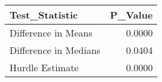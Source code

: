 \begin{table}
\centering\begingroup\fontsize{6}{8}\selectfont

\begin{tabular}{lr}
\toprule
Test\_Statistic & P\_Value\\
\midrule
Difference in Means & 0.0000\\
Difference in Medians & 0.0404\\
Hurdle Estimate & 0.0000\\
\bottomrule
\end{tabular}
\endgroup{}
\end{table}
